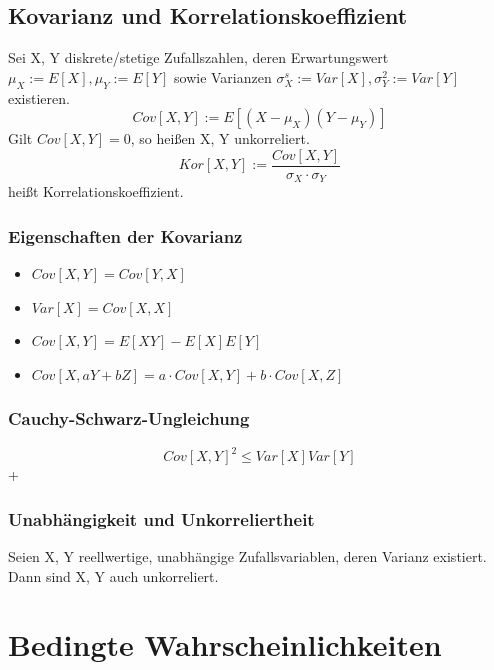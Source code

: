 \documentclass{report}
\begin{document}
\section*{Kovarianz und Korrelationskoeffizient}
Sei X, Y diskrete/stetige Zufallszahlen, deren Erwartungswert $\mu_X := E[X], \mu_Y := E[Y]$ sowie Varianzen $\sigma^s_X := Var[X], \sigma^2_Y := Var[Y]$ existieren.
\[Cov[X, Y] := E[(X-\mu_X)(Y-\mu_Y)]\]
Gilt $Cov[X, Y] = 0$, so heißen X, Y unkorreliert.
\[Kor[X, Y] := \frac{Cov[X, Y]}{\sigma_X \cdot \sigma_Y}\] heißt Korrelationskoeffizient.
\subsection*{Eigenschaften der Kovarianz}
\begin{itemize}
    \item $Cov[X, Y] = Cov[Y, X]$
    \item $Var[X] = Cov[X, X]$
    \item $Cov[X, Y] = E[XY] - E[X]E[Y]$
    \item $Cov[X, aY+bZ] = a \cdot Cov[X, Y] + b \cdot Cov[X, Z]$
\end{itemize}
\subsection*{Cauchy-Schwarz-Ungleichung}
\[Cov[X, Y]^2 \leq Var[X]Var[Y]\]+
\subsection*{Unabhängigkeit und Unkorreliertheit}
Seien X, Y reellwertige, unabhängige Zufallsvariablen, deren Varianz existiert. Dann sind X, Y auch unkorreliert.
\chapter*{Bedingte Wahrscheinlichkeiten}
\end{document}
